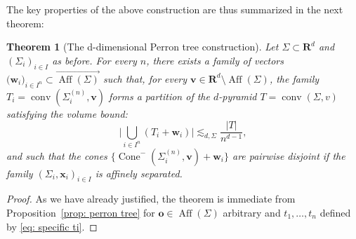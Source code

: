 \documentclass[10pt]{amsart}
\newcommand{\R}{\mathbf{R}}
\newcommand{\conv}{\operatorname{conv}}
\newcommand{\aff}{\operatorname{Aff}}
\newcommand{\ocone}[2]{\operatorname{Cone}^-(#1,#2)}
\newtheorem{theorem}{Theorem}[section]
\begin{document}
The key properties of the above construction are thus summarized in the next theorem:
\begin{theorem}[The d-dimensional Perron tree construction]\label{theo: perron tree}
Let $\Sigma \subset \R^d$ and $(\Sigma_i)_{i\in I}$ as before. For every $n$, there exists a family of vectors $\big(\mathbf{w}_i\big)_{i\in I^n}\subset \overrightarrow{\operatorname{Aff}(\Sigma)}$ such that, for every $\mathbf{v} \in \R^d\setminus \aff(\Sigma)$, the family $T_i = \conv(\Sigma_i^{(n)},\mathbf{v})$ forms a partition of the $d$-pyramid $T=\conv(\Sigma,v)$ satisfying the volume bound:
\begin{equation}\label{eq: general simplex volume}
    \bigg|\bigcup_{i\in I^n}(T_i+\mathbf{w}_i)\bigg|\lesssim_{d,\Sigma} \frac{|T|}{n^{d-1}},
\end{equation}
and such that the cones $\{\ocone{\Sigma_i^{(n)}}{\mathbf{v}}+\mathbf{w}_i\}$ are pairwise disjoint if the family $(\Sigma_i,\mathbf{x}_i)_{i \in I}$ is affinely separated.
\end{theorem}
\begin{proof}
As we have already justified, the theorem is immediate from Proposition~\ref{prop: perron tree} for $\mathbf{o} \in \aff(\Sigma)$ arbitrary and $t_1,\dots,t_n$ defined by \eqref{eq: specific ti}. 
\end{proof}
\end{document}
